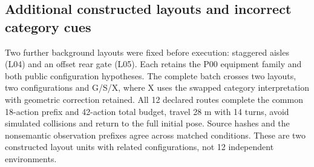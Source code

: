 \subsection{Additional constructed layouts and incorrect category cues}\label{nov19-controlled}

Two further background layouts were fixed before execution: staggered aisles (L04) and an offset rear gate (L05). Each retains the P00 equipment family and both public configuration hypotheses. The complete batch crosses two layouts, two configurations and G/S/X, where X uses the swapped category interpretation with geometric correction retained. All 12 declared routes complete the common 18-action prefix and 42-action total budget, travel 28 m with 14 turns, avoid simulated collisions and return to the full initial pose. Source hashes and the nonsemantic observation prefixes agree across matched conditions. These are two constructed layout units with related configurations, not 12 independent environments.

